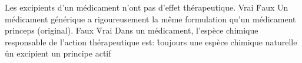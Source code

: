 \q
Les excipients d'un médicament n'ont pas d'effet thérapeutique.
\rv
Vrai
\r
Faux
\q
Un médicament générique a rigoureusement la même formulation qu'un médicament princeps (original).
\rv
Faux
\r
Vrai
\q
Dans un médicament, l'espèce chimique responsable de l'action thérapeutique est: 
\r
toujours une espèce chimique naturelle 
\r
un excipient 
\rv
un principe actif 

